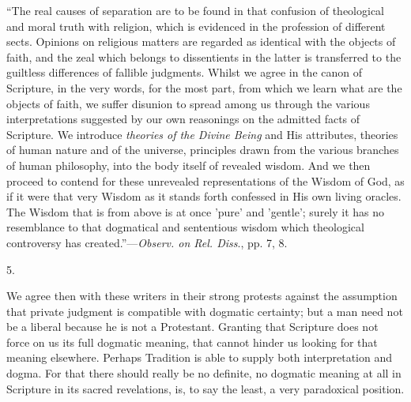 ``The
real causes of separation are to be found in that confusion of
theological and moral truth with religion, which is evidenced in the
profession of different sects. Opinions on religious matters are
regarded as identical with the objects of faith, and the zeal which
belongs to dissentients in the latter is transferred to the guiltless
differences of fallible judgments. Whilst we agree in the canon of
Scripture, in the very words, for the most part, from which we learn
what are the objects of faith, we suffer disunion to spread among us
through the various interpretations suggested by our own reasonings on
the admitted facts of Scripture. We introduce \emph{theories of the
Divine Being} and His attributes, theories of human nature and of
the universe, principles drawn from the various branches of human
philosophy, into the body itself of revealed wisdom. And we then
proceed to contend for these unrevealed representations of the Wisdom
of God, as if it were that very Wisdom as it stands forth confessed in His own living oracles.
The Wisdom that is from above is at once 'pure' and 'gentle'; surely
it has no resemblance to that dogmatical and sententious wisdom which
theological controversy has created.''—\emph{Observ. on Rel. Diss}.,
pp. 7, 8.

5.

We agree then with these writers in their strong
protests against the assumption that private judgment is compatible
with dogmatic certainty; but a man need not be a liberal because he is
not a Protestant. Granting that Scripture does not force on us its
full dogmatic meaning, that cannot hinder us looking for that meaning
elsewhere. Perhaps Tradition is able to supply both interpretation and
dogma. For that there should really be no definite, no dogmatic
meaning at all in Scripture in its sacred revelations, is, to say the
least, a very paradoxical position.

